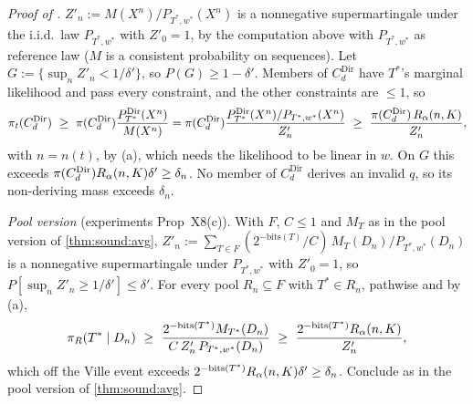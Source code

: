 \begin{proof}[Proof of ]
$Z'_n:=M(X^n)/P_{T^*,w^*}(X^n)$ is a nonnegative supermartingale under the i.i.d.\ law $P_{T^*,w^*}$ with $Z'_0=1$, by the computation above with $P_{T^*,w^*}$ as reference law ($M$ is a consistent probability on sequences). Let $G:=\{\sup_nZ'_n<1/\delta'\}$, so $P(G)\ge1-\delta'$. Members of $C^{\mathrm{Dir}}_d$ have $T^*$'s marginal likelihood and pass every constraint, and the other constraints are $\le1$, so
\[
\pi_t(C^{\mathrm{Dir}}_d)\ \ge\ \pi(C^{\mathrm{Dir}}_d)\frac{\PDir{T^*}(X^n)}{M(X^n)}
=\pi(C^{\mathrm{Dir}}_d)\frac{\PDir{T^*}(X^n)/P_{T^*,w^*}(X^n)}{Z'_n}\ \ge\ \frac{\pi(C^{\mathrm{Dir}}_d)\,\Rreg(n,K)}{Z'_n},
\]
with $n=n(t)$, by (a), which needs the likelihood to be linear in $w$. On $G$ this exceeds $\pi(C^{\mathrm{Dir}}_d)R_{\alpha}(n,K)\delta'\ge\delta_n$. No member of $C^{\mathrm{Dir}}_d$ derives an invalid $q$, so its non-deriving mass exceeds $\delta_n$.

\emph{Pool version} (experiments Prop~X8(c)). With $F$, $C\le1$ and $M_T$ as in the pool version of \cref{thm:sound:avg}, $Z'_n:=\sum_{T\in F}(2^{-\mathrm{bits}(T)}/C)\,M_T(D_n)/P_{T^*,w^*}(D_n)$ is a nonnegative supermartingale under $P_{T^*,w^*}$ with $Z'_0=1$, so $P[\sup_nZ'_n\ge1/\delta']\le\delta'$. For every pool $R_n\subseteq F$ with $T^*\in R_n$, pathwise and by (a),
\[
\pi_R(T^*\mid D_n)\ \ge\ \frac{2^{-\mathrm{bits}(T^*)}M_{T^*}(D_n)}{C\,Z'_n\,P_{T^*,w^*}(D_n)}\ \ge\ \frac{2^{-\mathrm{bits}(T^*)}\Rreg(n,K)}{Z'_n},
\]
which off the Ville event exceeds $2^{-\mathrm{bits}(T^*)}R_{\alpha}(n,K)\delta'\ge\delta_n$. Conclude as in the pool version of \cref{thm:sound:avg}.
\end{proof}


